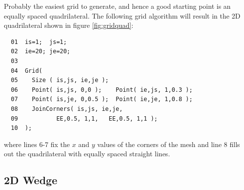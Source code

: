 \documentclass{warpdoc}
\begin{document}
Probably the easiest grid to generate, and hence a good starting point
is an equally spaced quadrilateral.
The following grid algorithm will result in the 2D quadrilateral
shown in figure \ref{fig:gridquad}:
%
\begin{verbatim}
  01  is=1;  js=1;
  02  ie=20; je=20;
  03
  04  Grid(
  05    Size ( is,js, ie,je );
  06    Point( is,js, 0,0 );    Point( ie,js, 1,0.3 );
  07    Point( is,je, 0,0.5 );  Point( ie,je, 1,0.8 );
  08    JoinCorners( is,js, ie,je,
  09           EE,0.5, 1,1,   EE,0.5, 1,1 );
  10  );
\end{verbatim}
%
where lines 6-7 fix the $x$ and $y$ values of the corners of
the mesh and line 8 fills out the quadrilateral with
equally spaced straight lines.



\subsection{2D Wedge}
\end{document}
